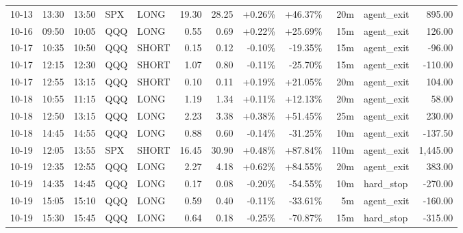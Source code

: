 \documentclass[11pt,a4paper]{article}
\begin{document}
\begin{center}
\begin{longtable}{>{\color{txtmain}}l l l l l r r r r r >{\color{txtmain}}l r}
10-13 & 13:30 & 13:50 & SPX & LONG & 19.30 & 28.25 & \textcolor{wingreen}{+0.26\%} & \textcolor{wingreen}{+46.37\%} & 20m & agent\_exit & \textcolor{wingreen}{895.00} \\
10-16 & 09:50 & 10:05 & QQQ & LONG & 0.55 & 0.69 & \textcolor{wingreen}{+0.22\%} & \textcolor{wingreen}{+25.69\%} & 15m & agent\_exit & \textcolor{wingreen}{126.00} \\
10-17 & 10:35 & 10:50 & QQQ & SHORT & 0.15 & 0.12 & \textcolor{lossred}{-0.10\%} & \textcolor{lossred}{-19.35\%} & 15m & agent\_exit & \textcolor{lossred}{-96.00} \\
10-17 & 12:15 & 12:30 & QQQ & SHORT & 1.07 & 0.80 & \textcolor{lossred}{-0.11\%} & \textcolor{lossred}{-25.70\%} & 15m & agent\_exit & \textcolor{lossred}{-110.00} \\
10-17 & 12:55 & 13:15 & QQQ & SHORT & 0.10 & 0.11 & \textcolor{wingreen}{+0.19\%} & \textcolor{wingreen}{+21.05\%} & 20m & agent\_exit & \textcolor{wingreen}{104.00} \\
10-18 & 10:55 & 11:15 & QQQ & LONG & 1.19 & 1.34 & \textcolor{wingreen}{+0.11\%} & \textcolor{wingreen}{+12.13\%} & 20m & agent\_exit & \textcolor{wingreen}{58.00} \\
10-18 & 12:50 & 13:15 & QQQ & LONG & 2.23 & 3.38 & \textcolor{wingreen}{+0.38\%} & \textcolor{wingreen}{+51.45\%} & 25m & agent\_exit & \textcolor{wingreen}{230.00} \\
10-18 & 14:45 & 14:55 & QQQ & LONG & 0.88 & 0.60 & \textcolor{lossred}{-0.14\%} & \textcolor{lossred}{-31.25\%} & 10m & agent\_exit & \textcolor{lossred}{-137.50} \\
10-19 & 12:05 & 13:55 & SPX & SHORT & 16.45 & 30.90 & \textcolor{wingreen}{+0.48\%} & \textcolor{wingreen}{+87.84\%} & 110m & agent\_exit & \textcolor{wingreen}{1,445.00} \\
10-19 & 12:35 & 12:55 & QQQ & LONG & 2.27 & 4.18 & \textcolor{wingreen}{+0.62\%} & \textcolor{wingreen}{+84.55\%} & 20m & agent\_exit & \textcolor{wingreen}{383.00} \\
10-19 & 14:35 & 14:45 & QQQ & LONG & 0.17 & 0.08 & \textcolor{lossred}{-0.20\%} & \textcolor{lossred}{-54.55\%} & 10m & hard\_stop & \textcolor{lossred}{-270.00} \\
10-19 & 15:05 & 15:10 & QQQ & LONG & 0.59 & 0.40 & \textcolor{lossred}{-0.11\%} & \textcolor{lossred}{-33.61\%} & 5m & agent\_exit & \textcolor{lossred}{-160.00} \\
10-19 & 15:30 & 15:45 & QQQ & LONG & 0.64 & 0.18 & \textcolor{lossred}{-0.25\%} & \textcolor{lossred}{-70.87\%} & 15m & hard\_stop & \textcolor{lossred}{-315.00} \\

\end{longtable}
\end{center}
\end{document}
